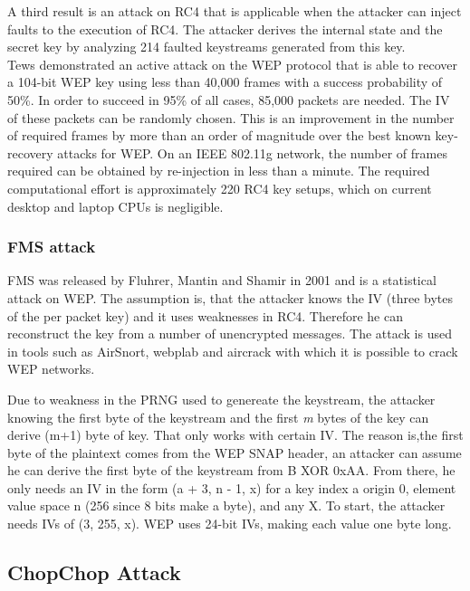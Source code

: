 \documentclass[a4paper,12pt,pagesize,headsepline,bibtotoc,titlepage]{scrartcl}
\begin{document}
A third result is an attack on RC4 that is applicable when the attacker can inject faults to the execution of RC4. The attacker derives the internal state and the secret key by analyzing 214 faulted keystreams generated from this key.\\


Tews \cite{tews} demonstrated an active attack on the WEP protocol that is able to recover a 104-bit WEP key using less than 40,000 frames with a success probability of 50\%. In order to succeed in 95\% of all cases, 85,000 packets are needed. The IV of these packets can be randomly chosen. This is an improvement in the number of required frames by more than an  order of magnitude over the best known key-recovery attacks for WEP.
On an IEEE 802.11g network, the number of frames required can be obtained by re-injection in less than a minute. The required computational effort is approximately 220 RC4 key setups, which on current desktop and laptop CPUs is negligible. 



\subsubsection{FMS attack}
FMS was released by Fluhrer, Mantin and Shamir in 2001 \cite{fms2002} and is a statistical attack on WEP.
The assumption is, that the attacker knows the IV (three bytes of the per packet key) and it uses weaknesses in RC4. Therefore he can reconstruct the key from a number of unencrypted messages.
The attack is used in tools such as AirSnort, webplab and aircrack with which it is possible to crack WEP networks.

Due to weakness in the PRNG used to genereate the keystream, the attacker knowing the first byte of the keystream and the first \emph{m} bytes of the key can derive (m+1) byte of key. That only works with certain IV.
The reason is,the first byte of the plaintext comes from the WEP SNAP header, an attacker can assume he can derive the first byte of the keystream from B XOR 0xAA. From there, he only needs an IV in the form (a + 3, n - 1, x) for a key index a origin 0, element value space n (256 since 8 bits make a byte), and any X. To start, the attacker needs IVs of (3, 255, x). WEP uses 24-bit IVs, making each value one byte long.\cite{wikipedia-fms}
\subsection{ChopChop Attack}
\end{document}
